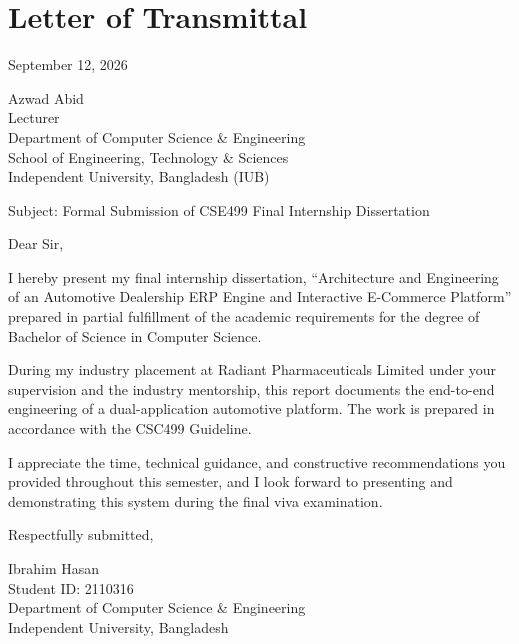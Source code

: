 \chapter*{Letter of Transmittal}

\noindent
September 12, 2026

\vspace{0.3cm}
\noindent
Azwad Abid\\
Lecturer\\
Department of Computer Science \& Engineering\\
School of Engineering, Technology \& Sciences\\
Independent University, Bangladesh (IUB)

\vspace{0.5cm}
\noindent
Subject: Formal Submission of CSE499 Final Internship Dissertation

\vspace{0.5cm}
\noindent
Dear Sir,

I hereby present my final internship dissertation, ``Architecture and Engineering of an Automotive Dealership ERP Engine and Interactive E-Commerce Platform'' prepared in partial fulfillment of the academic requirements for the degree of Bachelor of Science in Computer Science.

During my industry placement at Radiant Pharmaceuticals Limited under your supervision and the industry mentorship, this report documents the end-to-end engineering of a dual-application automotive platform. The work is prepared in accordance with the CSC499 Guideline.

I appreciate the time, technical guidance, and constructive recommendations you provided throughout this semester, and I look forward to presenting and demonstrating this system during the final viva examination.

\vspace{0.5cm}
\noindent
Respectfully submitted,

\vspace{1.5cm}
\noindent
Ibrahim Hasan\\
Student ID: 2110316\\
Department of Computer Science \& Engineering\\
Independent University, Bangladesh
